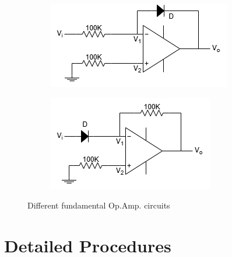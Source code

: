 \begin{figure}[h]
    \vspace{0.2 cm}
        \begin{subfigure}[h]{0.47\textwidth}
        \begin{center}
            \includegraphics[width=1\linewidth]{Lab11/Lab11c.drawio.png} 
            \caption{}
            \label{L11c}
        \end{center}
        \end{subfigure}
    \hfill
        \begin{subfigure}[h]{0.47\textwidth}
        \begin{center}
            \includegraphics[width=1\linewidth]{Lab11/Lab11d.drawio.png}
            \caption{}
            \label{L11d}
        \end{center}
        \end{subfigure}

    \caption{Different fundamental Op.Amp. circuits}
    \label{l11fs}
    
    \end{figure}
    \FloatBarrier

\section{Detailed Procedures}
